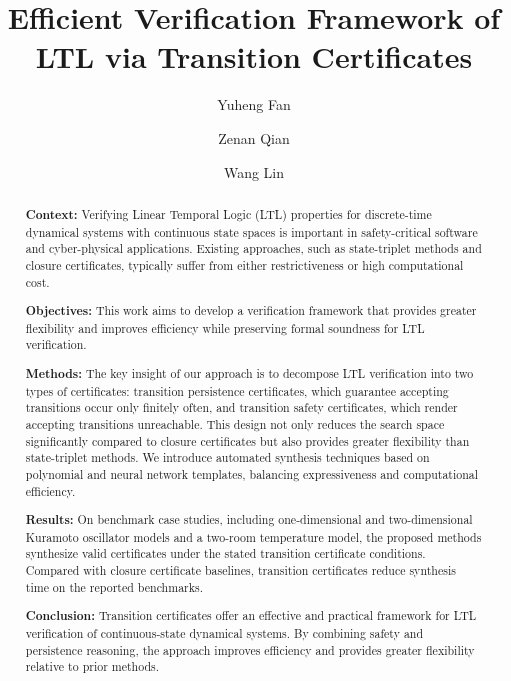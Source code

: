 \documentclass[a4paper,fleqn]{cas-sc}
\theoremstyle{definition}
\begin{document}
\let\WriteBookmarks\relax
\def\floatpagepagefraction{1}
\def\textpagefraction{.001}


\title[mode=title]{Efficient Verification Framework of LTL via Transition Certificates}

\author{Yuheng Fan}
\author{Zenan Qian}
\author{Wang Lin}
\cormark[1]



\begin{abstract}
\noindent\textbf{Context:} Verifying Linear Temporal Logic (LTL) properties for discrete-time dynamical systems with continuous state spaces is important in safety-critical software and cyber-physical applications. Existing approaches, such as state-triplet methods and closure certificates, typically suffer from either restrictiveness or high computational cost.\par
\noindent\textbf{Objectives:} This work aims to develop a verification framework that provides greater flexibility and improves efficiency while preserving formal soundness for LTL verification.\par
\noindent\textbf{Methods:} The key insight of our approach is to decompose LTL verification into two types of certificates: transition persistence certificates, which guarantee accepting transitions occur only finitely often, and transition safety certificates, which render accepting transitions unreachable. This design not only reduces the search space significantly compared to closure certificates but also provides greater flexibility than state-triplet methods. We introduce automated synthesis techniques based on polynomial and neural network templates, balancing expressiveness and computational efficiency.\par
\noindent\textbf{Results:} On benchmark case studies, including one-dimensional and two-dimensional Kuramoto oscillator models and a two-room temperature model, the proposed methods synthesize valid certificates under the stated transition certificate conditions. Compared with closure certificate baselines, transition certificates reduce synthesis time on the reported benchmarks.\par
\noindent\textbf{Conclusion:} Transition certificates offer an effective and practical framework for LTL verification of continuous-state dynamical systems. By combining safety and persistence reasoning, the approach improves efficiency and provides greater flexibility relative to prior methods.
\end{abstract}
\end{document}
